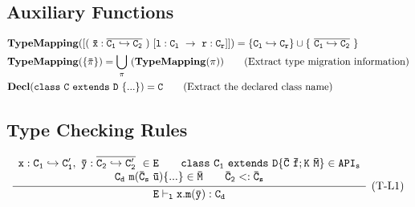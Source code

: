 \documentclass[letterpaper]{article}
\begin{document}
\begin{center}
\DP
\end{center}
\vspace{2pt}

\begin{center}
\DP
\end{center}
\vspace{2pt}

\begin{center}
                 
\DP
\end{center}


\subsection{Auxiliary Functions}
\begin{align*}  
&\tt \mathbf{TypeMapping}([(~\bar{x}:\overline{C_1\hookrightarrow C_2}~)\ [l:C_l\ \rightarrow\ r:C_r]]) = \{C_l\hookrightarrow C_r\}\cup\{~\overline{C_1\hookrightarrow C_2}~\}\\
&\tt \mathbf{TypeMapping}(\{\bar{\pi}\}) = \bigcup_{\pi}~(\mathbf{TypeMapping}(\pi)) ~~~~~~ \text{(Extract type migration information)}\\
&\tt \mathbf{Decl}(class~C~extends~D~\{...\}) = C   ~~~~~~ \text{(Extract the declared class name)}
\end{align*}


\subsection{Type Checking Rules}

\[
  \begin{array}{c}
    \infer[\text{(T-L1)}]
    {\tt E\vdash_l x.m(\bar{y}):C_d}
    {
      \begin{array}{c}
          \tt x:C_1\hookrightarrow C'_1,~\bar{y}:\overline{C_2\hookrightarrow C'_2}~ \in E ~~~~~~ \tt class\ C_1\ extends\ D \{\bar{C}\ \bar{f}; K\ \bar{M}\}\in API_s\\
          \tt \tt C_d\ m(\bar{C}_s\ \bar{u})\{...\} \in \bar{M} ~~~~~~ \bar{C}_2<:\bar{C}_s
      \end{array}
    }
  \end{array}
\]
\end{document}
